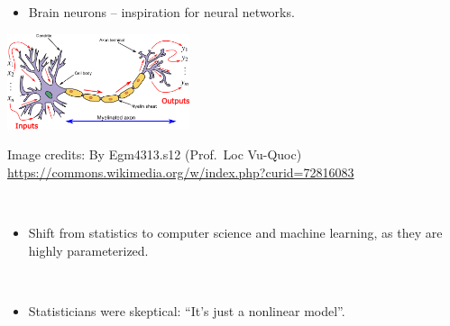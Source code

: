 \documentclass[
  10pt,
  ignorenonframetext,
]{beamer}
\providecommand{\tightlist}{%
  \setlength{\itemsep}{0pt}\setlength{\parskip}{0pt}}
\begin{document}
\begin{frame}
\begin{itemize}
\tightlist
\item
  Brain neurons -- inspiration for neural networks.
\end{itemize}

\centering

\includegraphics[width=0.4\textwidth,height=\textheight]{Neuron3.png}

\scriptsize

Image credits: By Egm4313.s12 (Prof.~Loc Vu-Quoc)
\url{https://commons.wikimedia.org/w/index.php?curid=72816083}

\flushleft

\normalsize

\(~\)

\begin{itemize}
\tightlist
\item
  Shift from statistics to computer science and machine learning, as
  they are highly parameterized.
\end{itemize}

\(~\)

\begin{itemize}
\tightlist
\item
  Statisticians were skeptical: ``It's just a nonlinear model''.
\end{itemize}
\end{frame}
\end{document}
